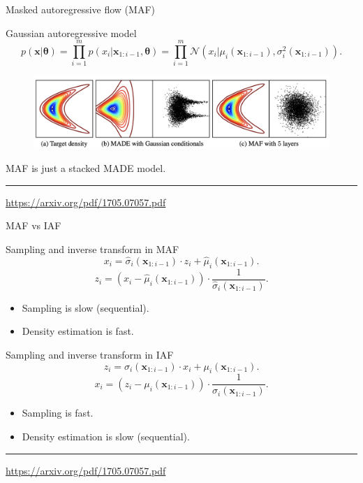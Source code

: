 \documentclass{beamer}
\newcommand{\bx}{\mathbf{x}}
\newcommand{\btheta}{\boldsymbol{\theta}}
\begin{document}
\begin{frame}{Masked autoregressive flow (MAF)}
	\begin{block}{Gaussian autoregressive model}
		\vspace{-0.5cm}
		\[
		p(\bx | \btheta) = \prod_{i=1}^m p(x_i | \bx_{1:i - 1}, \btheta) = \prod_{i=1}^m \mathcal{N} \left(x_i | \mu_i(\bx_{1:i-1}), \sigma^2_i (\bx_{1:i-1})\right).
		\]
		\vspace{-0.5cm}
	\end{block}
	\begin{figure}
		\includegraphics[width=\linewidth]{figs/maf1.png}
	\end{figure}
	MAF is just a stacked MADE model.
	\vfill
	\hrule\medskip
	{\scriptsize \href{https://arxiv.org/pdf/1705.07057.pdf}{https://arxiv.org/pdf/1705.07057.pdf}} 
\end{frame}
\begin{frame}{MAF vs IAF}
	\begin{block}{Sampling and inverse transform in MAF}
		\vspace{-0.2cm}
		\[
			x_i = \hat{\sigma}_i (\bx_{1:i-1}) \cdot z_i + \hat{\mu}_i(\bx_{1:i-1}).
		\]
		\[
			z_i = \left(x_i - \hat{\mu}_i(\bx_{1:i-1}) \right) \cdot \frac{1}{\hat{\sigma}_i (\bx_{1:i-1}) }.
		\]
		\vspace{-0.5cm}
		\begin{itemize}
			\item Sampling is slow (sequential).
			\item Density estimation is fast.
		\end{itemize}
	\end{block}
	\begin{block}{Sampling and inverse transform in IAF}
		\vspace{-0.2cm}
		\[
			z_i = \sigma_i (\bx_{1:i-1}) \cdot x_i + \mu_i(\bx_{1:i-1}).
		\]
		\[
			x_i = \left(z_i - \mu_i(\bx_{1:i-1}) \right) \cdot \frac{1}{\sigma_i (\bx_{1:i-1})}.
		\]
		\vspace{-0.3cm}
		\begin{itemize}
			\item Sampling is fast.
			\item Density estimation is slow (sequential).
		\end{itemize}
	\end{block}
	
	\vfill
	\hrule\medskip
	{\scriptsize \href{https://arxiv.org/pdf/1705.07057.pdf}{https://arxiv.org/pdf/1705.07057.pdf}} 
\end{frame}
\end{document}
